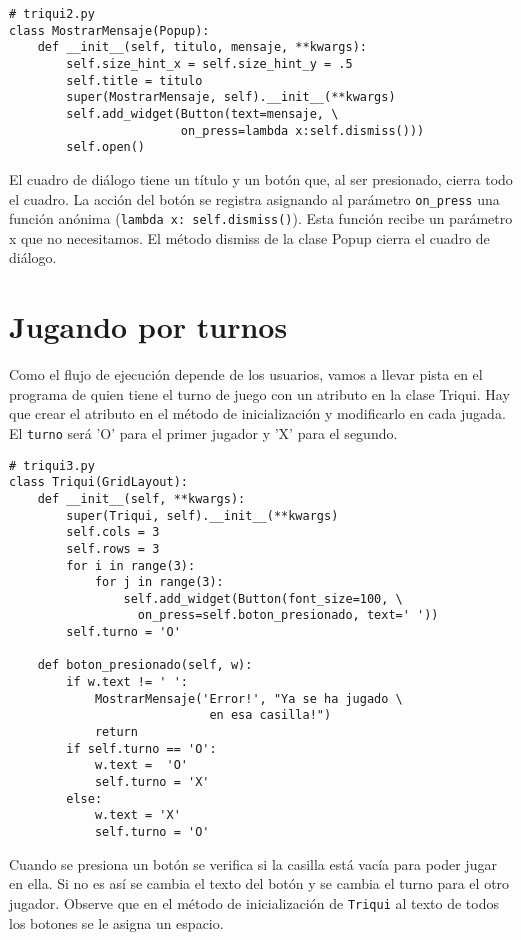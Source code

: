 \begin{lstlisting}
# triqui2.py
class MostrarMensaje(Popup): 
    def __init__(self, titulo, mensaje, **kwargs):
        self.size_hint_x = self.size_hint_y = .5
        self.title = titulo
        super(MostrarMensaje, self).__init__(**kwargs)
        self.add_widget(Button(text=mensaje, \
                        on_press=lambda x:self.dismiss()))
        self.open()
\end{lstlisting}
El cuadro de diálogo tiene un título y un botón que, al ser presionado,
cierra todo el cuadro. La acción del botón se registra asignando al
parámetro \lstinline!on_press!
una función anónima (\inputencoding{latin9}\lstinline!lambda x: self.dismiss()!).
Esta función recibe un parámetro x que no necesitamos. El método dismiss
de la clase Popup cierra el cuadro de diálogo.

\section{Jugando por turnos}

Como el flujo de ejecución depende de los usuarios, vamos a llevar
pista en el programa de quien tiene el turno de juego con un atributo
en la clase Triqui. Hay que crear el atributo en el método de inicialización
y modificarlo en cada jugada. El \texttt{turno} será 'O' para el primer
jugador y 'X' para el segundo.

\begin{lstlisting}
# triqui3.py
class Triqui(GridLayout):
    def __init__(self, **kwargs):
        super(Triqui, self).__init__(**kwargs)
        self.cols = 3
        self.rows = 3
        for i in range(3):
            for j in range(3):
                self.add_widget(Button(font_size=100, \
                  on_press=self.boton_presionado, text=' '))
        self.turno = 'O'

    def boton_presionado(self, w):
        if w.text != ' ':
            MostrarMensaje('Error!', "Ya se ha jugado \
                            en esa casilla!")
            return
        if self.turno == 'O':
            w.text =  'O'
            self.turno = 'X'
        else:
            w.text = 'X'
            self.turno = 'O'
\end{lstlisting}
\inputencoding{utf8}
Cuando se presiona un botón se verifica si la casilla está vacía para
poder jugar en ella. Si no es así se cambia el texto del botón y se
cambia el turno para el otro jugador. Observe que en el método de
inicialización de \texttt{Triqui} al texto de todos los botones se
le asigna un espacio.

